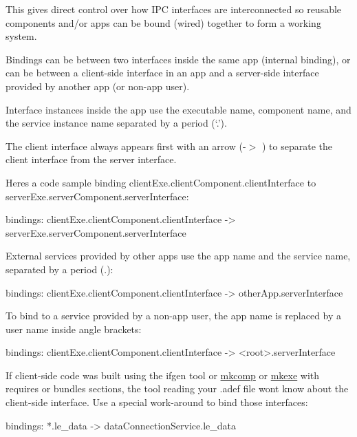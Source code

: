 This gives direct control over how I\+P\+C interfaces are interconnected so reusable components and/or apps can be bound (wired) together to form a working system.

Bindings can be between two interfaces inside the same app (internal binding), or can be between a client-\/side interface in an app and a server-\/side interface provided by another app (or non-\/app user).

Interface instances inside the app use the executable name, component name, and the service instance name separated by a period (‘.\+’).

The client interface always appears first with an arrow ({\ttfamily  -\/$>$ }) to separate the client interface from the server interface.

Here\textquotesingle{}s a code sample binding {\ttfamily client\+Exe.\+client\+Component.\+client\+Interface} to {\ttfamily server\+Exe.\+server\+Component.\+server\+Interface}\+:

\begin{DoxyVerb}bindings:
{
    clientExe.clientComponent.clientInterface -> serverExe.serverComponent.serverInterface
}
\end{DoxyVerb}


External services provided by other apps use the app name and the service name, separated by a period (\textquotesingle{}.\textquotesingle{})\+:

\begin{DoxyVerb}bindings:
{
    clientExe.clientComponent.clientInterface -> otherApp.serverInterface
}
\end{DoxyVerb}


To bind to a service provided by a non-\/app user, the app name is replaced by a user name inside angle brackets\+:

\begin{DoxyVerb}bindings:
{
    clientExe.clientComponent.clientInterface -> <root>.serverInterface
}
\end{DoxyVerb}


If client-\/side code was built using the {\ttfamily ifgen} tool or \hyperlink{buildToolsmkcomp}{mkcomp} or \hyperlink{buildToolsmkexe}{mkexe} with requires or bundles sections, the tool reading your .adef file won\textquotesingle{}t know about the client-\/side interface. Use a special work-\/around to bind those interfaces\+:

\begin{DoxyVerb}bindings:
{
    *.le_data -> dataConnectionService.le_data
}
\end{DoxyVerb}


